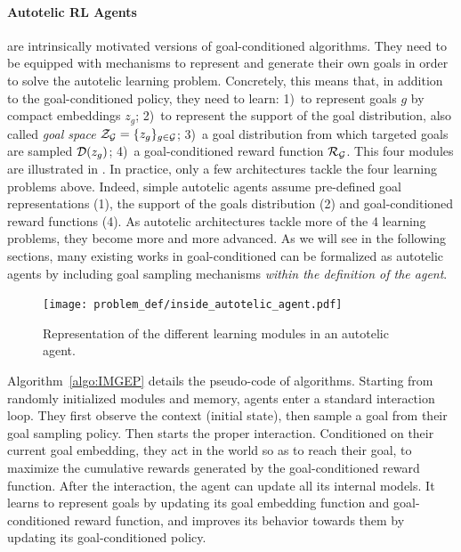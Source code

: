 \paragraph{Autotelic RL Agents}

\rlimgep are intrinsically motivated versions of goal-conditioned \rl algorithms. They need to be equipped with mechanisms to represent and generate their own goals in order to solve the autotelic learning problem. Concretely, this means that, in addition to the goal-conditioned policy, they need to learn: 1)~to represent goals $g$ by compact embeddings $z_g$; 2)~to represent the support of the goal distribution, also called \textit{goal space} $\mathcal{Z}_{\mathcal{G}}=\{z_g\}_{g\in\mathcal{G}}$; 3)~a goal distribution from which targeted goals are sampled $\mathcal{D}(z_g)$; 4)~a goal-conditioned reward function $\mathcal{R}_{\mathcal{G}}$. This four modules are illustrated in . In practice, only a few architectures tackle the four learning problems above. Indeed, simple autotelic agents assume pre-defined goal representations (1), the support of the goals distribution (2) and goal-conditioned reward functions (4). As autotelic architectures tackle more of the 4 learning problems, they become more and more advanced. As we will see in the following sections, many existing works in goal-conditioned \rl can be formalized as autotelic agents by including goal sampling mechanisms \textit{within the definition of the agent}. 
\begin{figure}[!h]
\centering
\texttt{[image: problem\_def/inside\_autotelic\_agent.pdf]}
\caption{Representation of the different learning modules in an autotelic agent. }
\label{fig:inside_autotelic_agents}
\end{figure}

Algorithm~\ref{algo:IMGEP} details the pseudo-code of \rlimgep algorithms. Starting from randomly initialized modules and memory, \rlimgep agents enter a standard \rl interaction loop. They first observe the context (initial state), then sample a goal from their goal sampling policy. Then starts the proper interaction. Conditioned on their current goal embedding, they act in the world so as to reach their goal, \ie to maximize the cumulative rewards generated by the goal-conditioned reward function. After the interaction, the agent can update all its internal models. It learns to represent goals by updating its goal embedding function and goal-conditioned reward function, and improves its behavior towards them by updating its goal-conditioned policy. 

